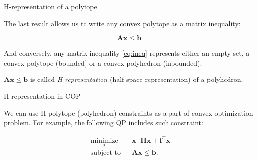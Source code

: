 \documentclass{beamer}
\begin{document}
\begin{frame}{H-representation of a polytope}
\begin{flushleft}

The last result allows us to write any convex polytope as a matrix inequality:

\begin{equation}
\label{eq:ineq} 
    \mathbf{A} \mathbf{x} \leq  \mathbf{b} 
\end{equation}

And conversely, any matrix inequality \eqref{eq:ineq} represents either an empty set, a convex polytope (bounded) or a convex polyhedron (inbounded).

\bigskip

\begin{definition}
 $\mathbf{A} \mathbf{x} \leq  \mathbf{b}$ is called \emph{H-representation} (half-space representation) of a polyhedron.
\end{definition}
 
\end{flushleft}
\end{frame}



\begin{frame}{H-representation in COP}
	\begin{flushleft}
		
		We can use H-polytope (polyhedron) constraints as a part of convex optimization problem. For example, the following QP includes such constraint:
		
		\begin{equation}
			\begin{aligned}
				& \underset{\mathbf{x}}{\text{minimize}}
				& & \mathbf{x}^\top \mathbf{H} \mathbf{x} + \mathbf{f}^\top\mathbf{x}, \\
				& \text{subject to}
				& & \mathbf{A}\mathbf{x} \leq \mathbf{b}.
			\end{aligned}
		\end{equation}
		
	\end{flushleft}
\end{frame}
\end{document}
